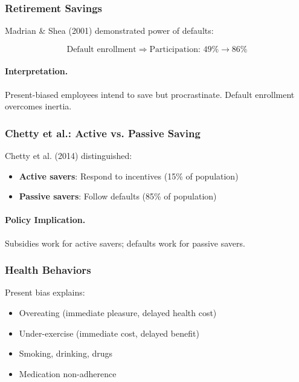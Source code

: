 \subsubsection{Retirement Savings}

Madrian \& Shea (2001) demonstrated power of defaults:

\begin{equation}
\boxed{
\text{Default enrollment} \Rightarrow \text{Participation: 49\%} \to \text{86\%}
}
\label{eq:default}
\end{equation}

\paragraph{Interpretation.}
Present-biased employees intend to save but procrastinate.
Default enrollment overcomes inertia.

\subsubsection{Chetty et al.: Active vs. Passive Saving}

Chetty et al. (2014) distinguished:
\begin{itemize}
    \item \textbf{Active savers}: Respond to incentives (15\% of population)
    \item \textbf{Passive savers}: Follow defaults (85\% of population)
\end{itemize}

\paragraph{Policy Implication.}
Subsidies work for active savers; defaults work for passive savers.

\subsubsection{Health Behaviors}

Present bias explains:
\begin{itemize}
    \item Overeating (immediate pleasure, delayed health cost)
    \item Under-exercise (immediate cost, delayed benefit)
    \item Smoking, drinking, drugs
    \item Medication non-adherence
\end{itemize}

